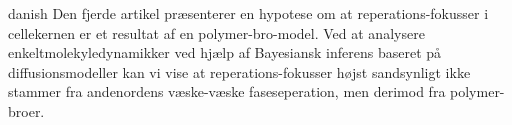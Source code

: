 \begin{otherlanguage*}{danish}
    Den fjerde artikel præsenterer en hypotese om at reperations-fokusser i cellekernen er et resultat af en polymer-bro-model. Ved at analysere enkeltmolekyledynamikker ved hjælp af Bayesiansk inferens baseret på diffusionsmodeller kan vi vise at reperations-fokusser højst sandsynligt ikke stammer fra andenordens væske-væske faseseperation, men derimod fra polymer-broer.

\end{otherlanguage*}